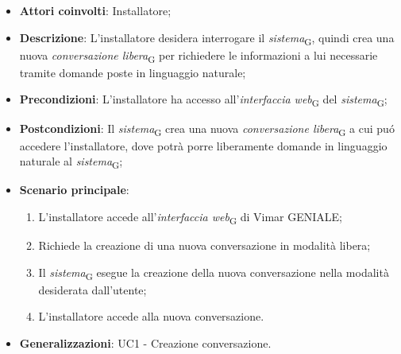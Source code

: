 \begin{itemize}
    \item \textbf{Attori coinvolti}: Installatore;
    \item \textbf{Descrizione}: L’installatore desidera interrogare il \textit{sistema}\textsubscript{G}, quindi crea una nuova \textit{conversazione libera}\textsubscript{G} per richiedere le informazioni a lui necessarie tramite domande poste in linguaggio naturale;
    \item \textbf{Precondizioni}: L’installatore ha accesso all’\textit{interfaccia web}\textsubscript{G} del \textit{sistema}\textsubscript{G};
    \item \textbf{Postcondizioni}: Il \textit{sistema}\textsubscript{G} crea una nuova \textit{conversazione libera}\textsubscript{G} a cui puó accedere l’installatore, dove potrà porre liberamente domande in linguaggio naturale al \textit{sistema}\textsubscript{G};
    \item \textbf{Scenario principale}:
    \begin{enumerate}
        \item L’installatore accede all’\textit{interfaccia web}\textsubscript{G} di Vimar GENIALE;
        \item Richiede la creazione di una nuova conversazione in modalità libera;
        \item Il \textit{sistema}\textsubscript{G} esegue la creazione della nuova conversazione nella modalità desiderata dall’utente;
        \item  L’installatore accede alla nuova conversazione.
    \end{enumerate}
    \item \textbf{Generalizzazioni}: UC1 - Creazione conversazione.
\end{itemize}

